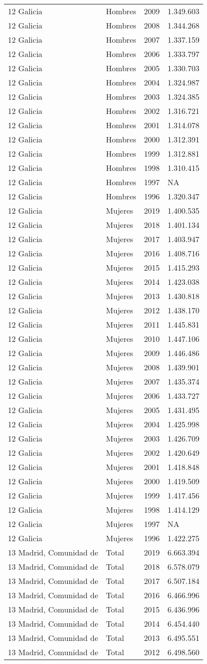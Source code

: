 \documentclass[
]{article}
\begin{document}
\begin{longtable}[]{@{}llrl@{}}
12 Galicia & Hombres & 2009 & 1.349.603\tabularnewline
12 Galicia & Hombres & 2008 & 1.344.268\tabularnewline
12 Galicia & Hombres & 2007 & 1.337.159\tabularnewline
12 Galicia & Hombres & 2006 & 1.333.797\tabularnewline
12 Galicia & Hombres & 2005 & 1.330.703\tabularnewline
12 Galicia & Hombres & 2004 & 1.324.987\tabularnewline
12 Galicia & Hombres & 2003 & 1.324.385\tabularnewline
12 Galicia & Hombres & 2002 & 1.316.721\tabularnewline
12 Galicia & Hombres & 2001 & 1.314.078\tabularnewline
12 Galicia & Hombres & 2000 & 1.312.391\tabularnewline
12 Galicia & Hombres & 1999 & 1.312.881\tabularnewline
12 Galicia & Hombres & 1998 & 1.310.415\tabularnewline
12 Galicia & Hombres & 1997 & NA\tabularnewline
12 Galicia & Hombres & 1996 & 1.320.347\tabularnewline
12 Galicia & Mujeres & 2019 & 1.400.535\tabularnewline
12 Galicia & Mujeres & 2018 & 1.401.134\tabularnewline
12 Galicia & Mujeres & 2017 & 1.403.947\tabularnewline
12 Galicia & Mujeres & 2016 & 1.408.716\tabularnewline
12 Galicia & Mujeres & 2015 & 1.415.293\tabularnewline
12 Galicia & Mujeres & 2014 & 1.423.038\tabularnewline
12 Galicia & Mujeres & 2013 & 1.430.818\tabularnewline
12 Galicia & Mujeres & 2012 & 1.438.170\tabularnewline
12 Galicia & Mujeres & 2011 & 1.445.831\tabularnewline
12 Galicia & Mujeres & 2010 & 1.447.106\tabularnewline
12 Galicia & Mujeres & 2009 & 1.446.486\tabularnewline
12 Galicia & Mujeres & 2008 & 1.439.901\tabularnewline
12 Galicia & Mujeres & 2007 & 1.435.374\tabularnewline
12 Galicia & Mujeres & 2006 & 1.433.727\tabularnewline
12 Galicia & Mujeres & 2005 & 1.431.495\tabularnewline
12 Galicia & Mujeres & 2004 & 1.425.998\tabularnewline
12 Galicia & Mujeres & 2003 & 1.426.709\tabularnewline
12 Galicia & Mujeres & 2002 & 1.420.649\tabularnewline
12 Galicia & Mujeres & 2001 & 1.418.848\tabularnewline
12 Galicia & Mujeres & 2000 & 1.419.509\tabularnewline
12 Galicia & Mujeres & 1999 & 1.417.456\tabularnewline
12 Galicia & Mujeres & 1998 & 1.414.129\tabularnewline
12 Galicia & Mujeres & 1997 & NA\tabularnewline
12 Galicia & Mujeres & 1996 & 1.422.275\tabularnewline
13 Madrid, Comunidad de & Total & 2019 & 6.663.394\tabularnewline
13 Madrid, Comunidad de & Total & 2018 & 6.578.079\tabularnewline
13 Madrid, Comunidad de & Total & 2017 & 6.507.184\tabularnewline
13 Madrid, Comunidad de & Total & 2016 & 6.466.996\tabularnewline
13 Madrid, Comunidad de & Total & 2015 & 6.436.996\tabularnewline
13 Madrid, Comunidad de & Total & 2014 & 6.454.440\tabularnewline
13 Madrid, Comunidad de & Total & 2013 & 6.495.551\tabularnewline
13 Madrid, Comunidad de & Total & 2012 & 6.498.560\tabularnewline

\end{longtable}
\end{document}
